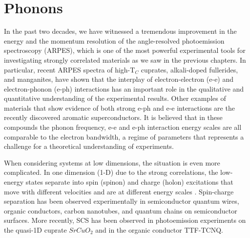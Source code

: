 \documentclass[article,11pt]{revtex4}
\begin{document}




\pagebreak
\section {Phonons}

In the past two decades, we have witnessed a tremendous
improvement in the energy and the momentum resolution of the
angle-resolved photoemission spectroscopy (ARPES), which is one of
the most powerful experimental tools for investigating strongly
correlated materials as we saw in the previous chapters. In particular, recent ARPES spectra of
high-T$_{C}$ cuprates\cite{Lanzara1,Lanzara2}, alkali-doped
fullerides\cite{Gunnarsson}, and manganites\cite{Lanzara3}, have
shown that the interplay of electron-electron (e-e) and
electron-phonon (e-ph) interactions has an important role in the
qualitative and quantitative understanding of the experimental
results. Other examples of materials that show evidence of both
strong e-ph and e-e interactions are the recently discovered
aromatic superconductors\cite{Kubozono,Kosugi,Kato,Subedi,Nomura}.
It is believed that in these compounds the phonon frequency, e-e
and e-ph interaction energy scales are all comparable to the
electron bandwidth, a regime of parameters that represents a
challenge for a theoretical understanding of experiments.

When considering systems at low dimensions, the situation is even
more complicated.
In one dimension (1-D) due to the strong correlations, the
low-energy states separate into spin (spinon) and charge (holon)
excitations that move with different velocities and are at
different energy scales \cite{Gogolin2004,GiamarchiBook,Deshpande}.
Spin-charge separation has been observed experimentally in
semiconductor quantum wires\cite{Auslander}, organic
conductors\cite{Lorenz}, carbon nanotubes\cite{Bockrath}, and
quantum chains on semiconductor surfaces\cite{Blumenstein}. 
More recently, SCS has been
observed in photoemission experiments on the quasi-1D cuprate
$SrCuO_{2}$\cite{Kim} and in the organic conductor
TTF-TCNQ\cite{Sing}.
\end{document}
